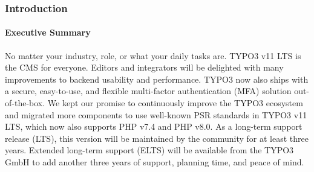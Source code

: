 %

\begin{frame}[fragile]
	\frametitle{Introduction}
	\framesubtitle{Executive Summary}

	\small
		No matter your industry, role, or what your daily tasks are.
		TYPO3 v11 LTS is the CMS for everyone.
		\vspace{0.2cm}
		Editors and integrators will be delighted with many improvements to backend usability and performance.
		TYPO3 now also ships with a secure, easy-to-use, and flexible multi-factor authentication (MFA) solution out-of-the-box.
		\vspace{0.2cm}
		We kept our promise to continuously improve the TYPO3 ecosystem and migrated more components to use well-known PSR standards in TYPO3 v11 LTS,
		which now also supports PHP v7.4 and PHP v8.0.
		\vspace{0.2cm}
		As a long-term support release (LTS), this version will be maintained by the community for at least three years.
		Extended long-term support (ELTS) will be available from the TYPO3 GmbH to add another three years of support, planning time, and peace of mind.
	\normalsize

\end{frame}

